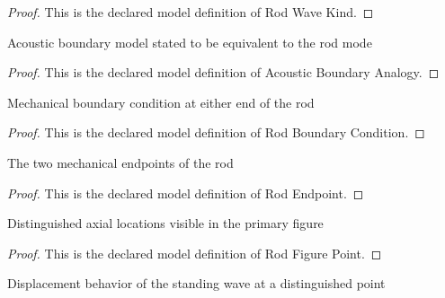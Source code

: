 \begin{proof}
  This is the declared model definition of Rod Wave Kind.
\end{proof}
\begin{definition}
  \label{def:physics:phyx-mini-0185:phyxminiproblems-problemphyxmini0185-acousticboundaryanalogy}
  Acoustic boundary model stated to be equivalent to the rod mode
\end{definition}
\begin{proof}
  This is the declared model definition of Acoustic Boundary Analogy.
\end{proof}
\begin{definition}
  \label{def:physics:phyx-mini-0185:phyxminiproblems-problemphyxmini0185-rodboundarycondition}
  Mechanical boundary condition at either end of the rod
\end{definition}
\begin{proof}
  This is the declared model definition of Rod Boundary Condition.
\end{proof}
\begin{definition}
  \label{def:physics:phyx-mini-0185:phyxminiproblems-problemphyxmini0185-rodendpoint}
  The two mechanical endpoints of the rod
\end{definition}
\begin{proof}
  This is the declared model definition of Rod Endpoint.
\end{proof}
\begin{definition}
  \label{def:physics:phyx-mini-0185:phyxminiproblems-problemphyxmini0185-rodfigurepoint}
  Distinguished axial locations visible in the primary figure
\end{definition}
\begin{proof}
  This is the declared model definition of Rod Figure Point.
\end{proof}
\begin{definition}
  \label{def:physics:phyx-mini-0185:phyxminiproblems-problemphyxmini0185-displacementfeature}
  Displacement behavior of the standing wave at a distinguished point
\end{definition}
